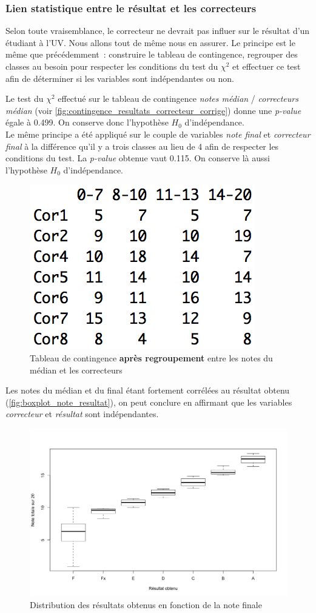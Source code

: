 \documentclass[a4paper,10pt]{report}
\begin{document}
\subsubsection{Lien statistique entre le résultat et les correcteurs}

Selon toute vraisemblance, le correcteur ne devrait pas influer sur le résultat d'un étudiant à l'UV. Nous allons tout de même nous en assurer. Le principe est le même que précédemment~: construire le tableau de contingence, regrouper des classes au besoin pour respecter les conditions du test du $\chi^2$ et effectuer ce test afin de déterminer si les variables sont indépendantes ou non.


Le test du $\chi^2$ effectué sur le tableau de contingence \textit{notes médian} / \textit{correcteurs médian} (voir \autoref{fig:contingence_resultats_correcteur_corrige}) donne une \textit{p-value} égale à 0.499. On conserve donc l'hypothèse $H_{0}$ d'indépendance.
\\Le même principe a été appliqué sur le couple de variables \textit{note final} et \textit{correcteur final} à la différence qu'il y a trois classes au lieu de 4 afin de respecter les conditions du test. La \textit{p-value} obtenue vaut 0.115. On conserve là aussi l'hypothèse $H_{0}$ d'indépendance.


\begin{figure}[H]
	\centering
	\captionsetup{justification=centering, margin=4cm}
	\includegraphics[width=.2\linewidth]{img/1-1-2-Contingence-Result-Correcteur-Median-Corrige}
	\caption{\scriptsize Tableau de contingence \textbf{après regroupement} entre les notes du médian et les correcteurs}
	\label{fig:contingence_resultats_correcteur_corrige}
\end{figure}



Les notes du médian et du final étant fortement corrélées au résultat obtenu (\autoref{fig:boxplot_note_resultat}), on peut conclure en affirmant que les variables \textit{correcteur} et \textit{résultat} sont indépendantes.

\begin{figure}[H]
	\centering
	\captionsetup{justification=centering, margin=4cm}
	\includegraphics[width=.5\linewidth]{img/1-1-2-Boxplot-note-resultat}
	\caption{\scriptsize Distribution des résultats obtenus en fonction de la note finale}
	\label{fig:boxplot_note_resultat}
\end{figure}
\end{document}
